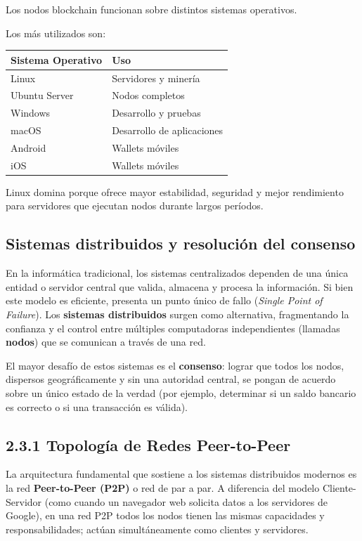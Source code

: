 \documentclass[12pt,a4paper]{article}
\begin{document}
Los nodos blockchain funcionan sobre distintos sistemas operativos.

Los más utilizados son:

\begin{longtable}{ll}
\toprule
\textbf{Sistema Operativo} & \textbf{Uso} \\
\midrule
\endhead
Linux & Servidores y minería \\
Ubuntu Server & Nodos completos \\
Windows & Desarrollo y pruebas \\
macOS & Desarrollo de aplicaciones \\
Android & Wallets móviles \\
iOS & Wallets móviles \\
\bottomrule
\end{longtable}

Linux domina porque ofrece mayor estabilidad, seguridad y mejor rendimiento para servidores que ejecutan nodos durante largos períodos.

\subsection{Sistemas distribuidos y resolución del consenso}

En la informática tradicional, los sistemas centralizados dependen de una única entidad o servidor central que valida, almacena y procesa la información. Si bien este modelo es eficiente, presenta un punto único de fallo (\textit{Single Point of Failure}). Los \textbf{sistemas distribuidos} surgen como alternativa, fragmentando la confianza y el control entre múltiples computadoras independientes (llamadas \textbf{nodos}) que se comunican a través de una red.

El mayor desafío de estos sistemas es el \textbf{consenso}: lograr que todos los nodos, dispersos geográficamente y sin una autoridad central, se pongan de acuerdo sobre un único estado de la verdad (por ejemplo, determinar si un saldo bancario es correcto o si una transacción es válida).

\subsection*{2.3.1 Topología de Redes Peer-to-Peer}

La arquitectura fundamental que sostiene a los sistemas distribuidos modernos es la red \textbf{Peer-to-Peer (P2P)} o red de par a par. A diferencia del modelo Cliente-Servidor (como cuando un navegador web solicita datos a los servidores de Google), en una red P2P todos los nodos tienen las mismas capacidades y responsabilidades; actúan simultáneamente como clientes y servidores.
\end{document}
